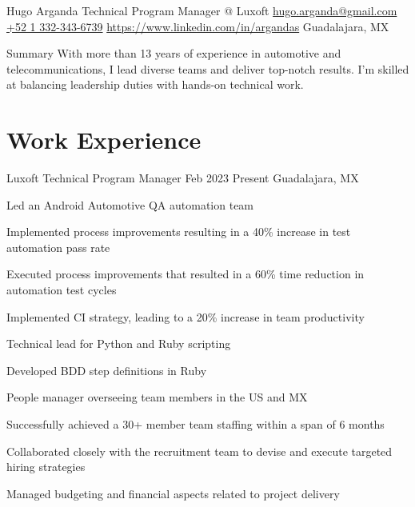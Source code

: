 \documentclass{resume} %
\begin{document}

\customheader
    {Hugo Arganda}
    {Technical Program Manager @ Luxoft}
    {\href{mailto:hugo.arganda@gmail.com}{hugo.arganda@gmail.com}}
    {\href{https://wa.me/5213323436739}{+52 1 332-343-6739}}
    {\href{https://www.linkedin.com/in/argandas}{https://www.linkedin.com/in/argandas}}
    {Guadalajara, MX}



\summary
{Summary}
    {With more than 13 years of experience in automotive and telecommunications, I lead diverse teams and deliver top-notch results. I'm skilled at balancing leadership duties with hands-on technical work.}



\section{Work Experience}


\job
    {Luxoft}
    {Technical Program Manager}
    {Feb 2023}
    {Present}
    {Guadalajara, MX}
    {
    \begin{itemize-bullets}
    \item{Led an Android Automotive QA automation team}
    \item{Implemented process improvements resulting in a 40\% increase in test automation pass rate}
    \item{Executed process improvements that resulted in a 60\% time reduction in automation test cycles}
    \item{Implemented CI strategy, leading to a 20\% increase in team productivity}
    \item{Technical lead for Python and Ruby scripting}
    \item{Developed BDD step definitions in Ruby}
    \item{People manager overseeing team members in the US and MX}
    \item{Successfully achieved a 30+ member team staffing within a span of 6 months}
    \item{Collaborated closely with the recruitment team to devise and execute targeted hiring strategies}
    \item{Managed budgeting and financial aspects related to project delivery}
    \end{itemize-bullets}
    }
\end{document}
